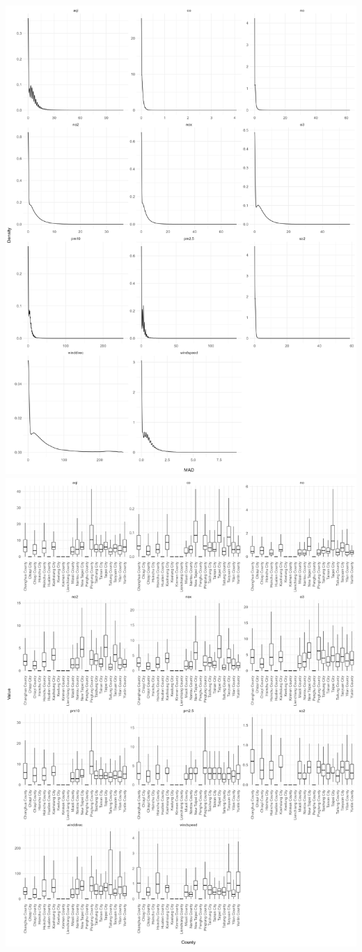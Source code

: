 \documentclass{article}
\begin{document}
\begin{enumerate}
    \includegraphics[width=6in]{question7/density.png}
    \includegraphics[width=6in]{question7/qq.png}

\end{enumerate}
\end{document}
